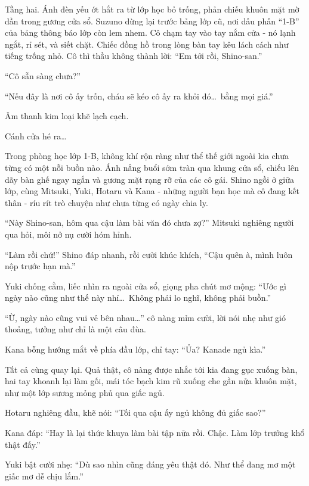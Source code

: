 \documentclass[../main.tex]{subfiles}
\begin{document}
Tầng hai. Ánh đèn yếu ớt hắt ra từ lớp học bỏ trống, phản chiếu khuôn mặt mờ dần trong gương cửa sổ. Suzuno dừng lại trước bảng lớp cũ, nơi dấu phấn ``1-B'' của bảng thông báo lớp còn lem nhem. Cô chạm tay vào tay nắm cửa - nó lạnh ngắt, rỉ sét, và siết chặt. Chiếc đồng hồ trong lòng bàn tay kêu lách cách như tiếng trống nhỏ. Cô thì thầu không thành lời: ``Em tới rồi, Shino-san.''

``Cô sẵn sàng chưa?''

``Nếu đây là nơi cô ấy trốn, cháu sẽ kéo cô ấy ra khỏi đó\dots\ bằng mọi giá.''

Âm thanh kim loại khẽ lạch cạch.

Cánh cửa hé ra\dots

\ct

Trong phòng học lớp 1-B, không khí rộn ràng như thể thế giới ngoài kia chưa từng có một nỗi buồn nào. Ánh nắng buổi sớm tràn qua khung cửa sổ, chiếu lên dãy bàn ghế ngay ngắn và gương mặt rạng rỡ của các cô gái. Shino ngồi ở giữa lớp, cùng Mitsuki, Yuki, Hotaru và Kana - những người bạn học mà cô đang kết thân - ríu rít trò chuyện như chưa từng có ngày chia ly.


``Này Shino-san, hôm qua cậu làm bài văn đó chưa zợ?'' Mitsuki nghiêng người qua hỏi, môi nở nụ cười hóm hỉnh.

``Làm rồi chứ!'' Shino đáp nhanh, rồi cười khúc khích, ``Cậu quên à, mình luôn nộp trước hạn mà.''

Yuki chống cằm, liếc nhìn ra ngoài cửa sổ, giọng pha chút mơ mộng: ``Ước gì ngày nào cũng như thế này nhỉ\dots\ Không phải lo nghĩ, không phải buồn.''

``Ừ, ngày nào cũng vui vẻ bên nhau\dots'' cô nàng mỉm cười, lời nói nhẹ như gió thoảng, tưởng như chỉ là một câu đùa.

Kana bỗng hướng mắt về phía đầu lớp, chỉ tay: ``Ủa? Kanade ngủ kìa.''


Tất cả cùng quay lại. Quả thật, cô nàng được nhắc tới kia đang gục xuống bàn, hai tay khoanh lại làm gối, mái tóc bạch kim rũ xuống che gần nửa khuôn mặt, như một lớp sương mỏng phủ qua giấc ngủ.

Hotaru nghiêng đầu, khẽ nói: ``Tối qua cậu ấy ngủ không đủ giấc sao?''

Kana đáp: ``Hay là lại thức khuya làm bài tập nữa rồi. Chậc. Làm lớp trưởng khổ thật đấy.''

Yuki bật cười nhẹ: ``Dù sao nhìn cũng đáng yêu thật đó. Như thể đang mơ một giấc mơ dễ chịu lắm.''
\end{document}
